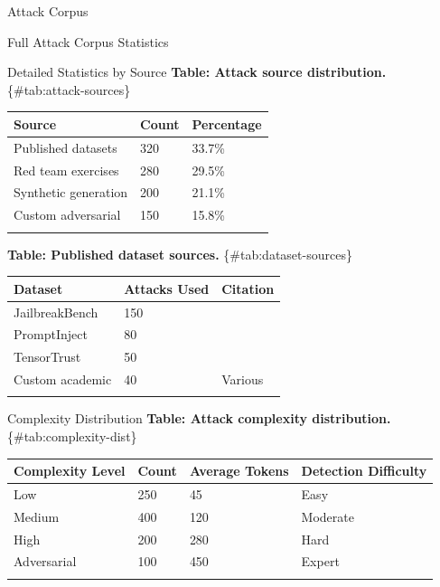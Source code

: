\documentclass[
  ignorenonframetext,
]{beamer}
\newcounter{none} %
\begin{document}
\begin{frame}[fragile]{Attack Corpus}
\begin{block}{Full Attack Corpus Statistics}
\begin{block}{Detailed Statistics by Source}
\protect{}\label{sec:source-stats}
\textbf{Table: Attack source distribution.} \{\#tab:attack-sources\}

{\def\LTcaptype{none} %
\begin{longtable}[]{@{}lll@{}}
\toprule\noalign{}
Source & Count & Percentage \\
\midrule\noalign{}
\endhead
Published datasets & 320 & 33.7\% \\
Red team exercises & 280 & 29.5\% \\
Synthetic generation & 200 & 21.1\% \\
Custom adversarial & 150 & 15.8\% \\
\bottomrule\noalign{}
\end{longtable}
}

\textbf{Table: Published dataset sources.} \{\#tab:dataset-sources\}

{\def\LTcaptype{none} %
\begin{longtable}[]{@{}lll@{}}
\toprule\noalign{}
Dataset & Attacks Used & Citation \\
\midrule\noalign{}
\endhead
JailbreakBench & 150 & \cite{chao2024jailbreakbench} \\
PromptInject & 80 & \cite{liu2023prompt} \\
TensorTrust & 50 & \cite{toyer2024tensortrust} \\
Custom academic & 40 & Various \\
\bottomrule\noalign{}
\end{longtable}
}
\end{block}

\begin{block}{Complexity Distribution}
\protect{}\label{sec:complexity-dist}
\textbf{Table: Attack complexity distribution.}
\{\#tab:complexity-dist\}

{\def\LTcaptype{none} %
\begin{longtable}[]{@{}llll@{}}
\toprule\noalign{}
Complexity Level & Count & Average Tokens & Detection Difficulty \\
\midrule\noalign{}
\endhead
Low & 250 & 45 & Easy \\
Medium & 400 & 120 & Moderate \\
High & 200 & 280 & Hard \\
Adversarial & 100 & 450 & Expert \\
\bottomrule\noalign{}
\end{longtable}
}
\end{block}


\end{block}
\end{frame}
\end{document}
